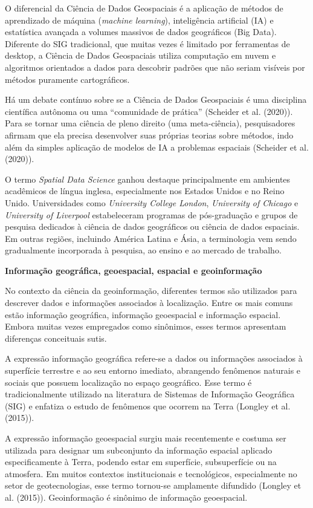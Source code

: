 \documentclass[
  letterpaper,
  DIV=11,
  numbers=noendperiod]{scrreprt}
\begin{document}
O diferencial da Ciência de Dados Geospaciais é a aplicação de métodos
de aprendizado de máquina (\emph{machine learning}), inteligência
artificial (IA) e estatística avançada a volumes massivos de dados
geográficos (Big Data). Diferente do SIG tradicional, que muitas vezes é
limitado por ferramentas de desktop, a Ciência de Dados Geospaciais
utiliza computação em nuvem e algoritmos orientados a dados para
descobrir padrões que não seriam visíveis por métodos puramente
cartográficos.

Há um debate contínuo sobre se a Ciência de Dados Geospaciais é uma
disciplina científica autônoma ou uma ``comunidade de prática''
(Scheider et al. (2020)). Para se tornar uma ciência de pleno direito
(uma meta-ciência), pesquisadores afirmam que ela precisa desenvolver
suas próprias teorias sobre métodos, indo além da simples aplicação de
modelos de IA a problemas espaciais (Scheider et al. (2020)).

O termo \emph{Spatial Data Science} ganhou destaque principalmente em
ambientes acadêmicos de língua inglesa, especialmente nos Estados Unidos
e no Reino Unido. Universidades como \emph{University College London},
\emph{University of Chicago} e \emph{University of Liverpool}
estabeleceram programas de pós-graduação e grupos de pesquisa dedicados
à ciência de dados geográficos ou ciência de dados espaciais. Em outras
regiões, incluindo América Latina e Ásia, a terminologia vem sendo
gradualmente incorporada à pesquisa, ao ensino e ao mercado de trabalho.

\textbf{Informação geográfica, geoespacial, espacial e geoinformação}

No contexto da ciência da geoinformação, diferentes termos são
utilizados para descrever dados e informações associados à localização.
Entre os mais comuns estão informação geográfica, informação geoespacial
e informação espacial. Embora muitas vezes empregados como sinônimos,
esses termos apresentam diferenças conceituais sutis.

A expressão informação geográfica refere-se a dados ou informações
associados à superfície terrestre e ao seu entorno imediato, abrangendo
fenômenos naturais e sociais que possuem localização no espaço
geográfico. Esse termo é tradicionalmente utilizado na literatura de
Sistemas de Informação Geográfica (SIG) e enfatiza o estudo de fenômenos
que ocorrem na Terra (Longley et al. (2015)).

A expressão informação geoespacial surgiu mais recentemente e costuma
ser utilizada para designar um subconjunto da informação espacial
aplicado especificamente à Terra, podendo estar em superfície,
subsuperfície ou na atmosfera. Em muitos contextos institucionais e
tecnológicos, especialmente no setor de geotecnologias, esse termo
tornou-se amplamente difundido (Longley et al. (2015)). Geoinformação é
sinônimo de informação geoespacial.
\end{document}
